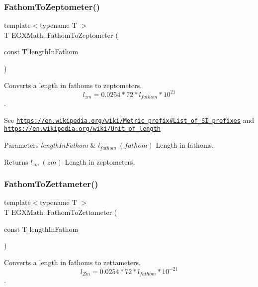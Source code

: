 \subsubsection{\texorpdfstring{Fathom\+To\+Zeptometer()}{FathomToZeptometer()}}
{\footnotesize\ttfamily template$<$typename T $>$ \\
T E\+G\+X\+Math\+::\+Fathom\+To\+Zeptometer (\begin{DoxyParamCaption}\item[{const T}]{length\+In\+Fathom }\end{DoxyParamCaption})}



Converts a length in fathoms to zeptometers. \[ l_{zm}=0.0254 * 72 * l_{fathom} * 10^{21} \]. 

See \href{https://en.wikipedia.org/wiki/Metric_prefix#List_of_SI_prefixes}{\tt https\+://en.\+wikipedia.\+org/wiki/\+Metric\+\_\+prefix\#\+List\+\_\+of\+\_\+\+S\+I\+\_\+prefixes} and \href{https://en.wikipedia.org/wiki/Unit_of_length}{\tt https\+://en.\+wikipedia.\+org/wiki/\+Unit\+\_\+of\+\_\+length} 
\begin{DoxyParams}{Parameters}
{\em length\+In\+Fathom} & $ l_{fathom}\ (fathom)$ Length in fathoms. \\
\hline
\end{DoxyParams}
\begin{DoxyReturn}{Returns}
$ l_{zm}\ (zm)$ Length in zeptometers. 
\end{DoxyReturn}
\mbox{\label{group___e_g_x_math-_conversions-_length_conversions-_imperial-_fathom-_s_i_ga3a5da531076421441774a6c7ac72bcc8}} 
\subsubsection{\texorpdfstring{Fathom\+To\+Zettameter()}{FathomToZettameter()}}
{\footnotesize\ttfamily template$<$typename T $>$ \\
T E\+G\+X\+Math\+::\+Fathom\+To\+Zettameter (\begin{DoxyParamCaption}\item[{const T}]{length\+In\+Fathom }\end{DoxyParamCaption})}



Converts a length in fathoms to zettameters. \[ l_{Zm}=0.0254 * 72 * l_{fathom} * 10^{-21} \]. 

